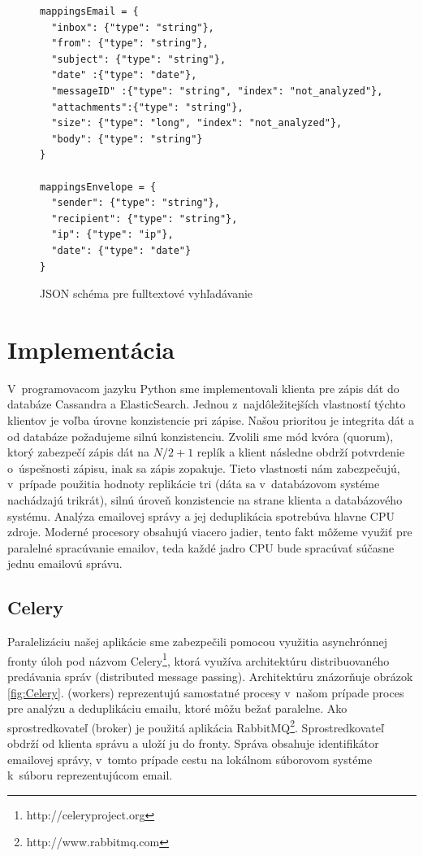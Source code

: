 \documentclass[11pt,twoside,a4paper]{book}
\begin{document}
\begin{figure}[h]
\begin{verbatim}
mappingsEmail = {
  "inbox": {"type": "string"},
  "from": {"type": "string"},
  "subject": {"type": "string"},
  "date" :{"type": "date"},
  "messageID" :{"type": "string", "index": "not_analyzed"},
  "attachments":{"type": "string"},
  "size": {"type": "long", "index": "not_analyzed"},
  "body": {"type": "string"}
}   
            
mappingsEnvelope = {
  "sender": {"type": "string"},
  "recipient": {"type": "string"},
  "ip": {"type": "ip"},
  "date": {"type": "date"}
}     
\end{verbatim}
 \caption{JSON schéma pre fulltextové vyhľadávanie}
 \label{fig:ESschema}
\end{figure}      

\newpage

\section{Implementácia}

V~programovacom jazyku Python sme implementovali klienta pre zápis dát do databáze Cassandra a ElasticSearch. Jednou z~najdôležitejších vlastností týchto klientov je voľba úrovne konzistencie pri zápise. Našou prioritou je integrita dát a od databáze požadujeme silnú konzistenciu. Zvolili sme mód kvóra (quorum), ktorý zabezpečí zápis dát na $N / 2 + 1$ replík a klient následne obdrží potvrdenie o~úspešnosti zápisu, inak sa zápis zopakuje. Tieto vlastnosti nám zabezpečujú, v~prípade použitia hodnoty replikácie tri (dáta sa v~databázovom systéme nachádzajú trikrát), silnú úroveň konzistencie na strane klienta a databázového systému. Analýza emailovej správy a jej deduplikácia spotrebúva hlavne CPU zdroje. Moderné procesory obsahujú viacero jadier, tento fakt môžeme využiť pre paralelné spracúvanie emailov, teda každé jadro CPU bude spracúvať súčasne jednu emailovú správu.

\subsection*{Celery}
Paralelizáciu našej aplikácie sme zabezpečili pomocou využitia asynchrónnej fronty úloh pod názvom Celery\footnote{http://celeryproject.org}, ktorá využíva architektúru distribuovaného predávania správ (distributed message passing). Architektúru znázorňuje obrázok \ref{fig:Celery}.  (workers) reprezentujú samostatné procesy v~našom prípade proces pre analýzu a deduplikáciu emailu, ktoré môžu bežať paralelne. Ako sprostredkovateľ (broker) je použitá aplikácia RabbitMQ\footnote{http://www.rabbitmq.com}. Sprostredkovateľ obdrží od klienta správu a uloží ju do fronty. Správa obsahuje identifikátor emailovej správy, v~tomto prípade cestu na lokálnom súborovom systéme k~súboru reprezentujúcom email.
\end{document}
